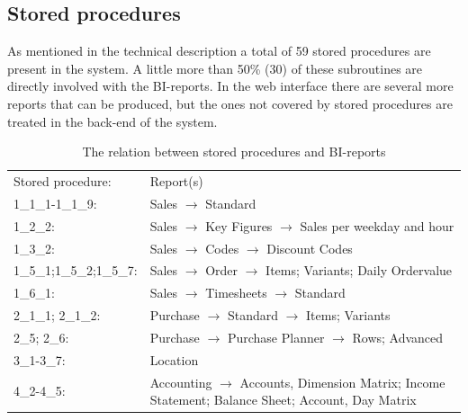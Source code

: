 \documentclass{cslthse-msc}
\begin{document}
\subsection{Stored procedures}
As mentioned in the technical description a total of 59 stored procedures are present in the system. A little more than 50\% (30) of these subroutines are directly involved with the BI-reports. In the web interface there are several more reports that can be produced, but the ones not covered by stored procedures are treated in the back-end of the system.  
\begin{table}[H]
\begin{center}
\begin{tabular}{l p{9cm}}
Stored procedure: & Report(s)\\
1\_1\_1-1\_1\_9: & Sales $\rightarrow$ Standard\\
1\_2\_2: & Sales $\rightarrow$ Key Figures $\rightarrow$ Sales per weekday and hour \\
1\_3\_2: & Sales $\rightarrow$ Codes $\rightarrow$ Discount Codes  \\
1\_5\_1;1\_5\_2;1\_5\_7: & Sales $\rightarrow$ Order $\rightarrow$ Items; Variants; Daily Ordervalue\\
1\_6\_1: & Sales $\rightarrow$ Timesheets $\rightarrow$ Standard \\
2\_1\_1; 2\_1\_2: & Purchase $\rightarrow$ Standard $\rightarrow$ Items; Variants \\
2\_5; 2\_6: & Purchase $\rightarrow$ Purchase Planner $\rightarrow$ Rows; Advanced\\
3\_1-3\_7: & Location \\
4\_2-4\_5: & Accounting $\rightarrow$ Accounts, Dimension Matrix; Income Statement; Balance Sheet; Account, Day Matrix \\
\end{tabular}
\caption{The relation between stored procedures and BI-reports}
\end{center}
\end{table}
\end{document}

